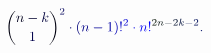 \documentclass[12pt]{article}
\begin{document}
\makeatletter
\renewcommand*{\@textcolor}[3]{%
  \protect\leavevmode
  \begingroup
    \color#1{#2}#3%
  \endgroup
}
\makeatother
\begin{displaymath}
{ \mathcolor[RGB]{0,0,15}{\binom { \mathcolor[RGB]{0,0,30}{n} \mathcolor[RGB]{0,0,45}{-} \mathcolor[RGB]{0,0,60}{k} } { \mathcolor[RGB]{0,0,75}{1} } } } ^ { \mathcolor[RGB]{0,0,90}{2} } \mathcolor[RGB]{0,0,105}{\cdot} \mathcolor[RGB]{0,0,120}{(} \mathcolor[RGB]{0,0,135}{n} \mathcolor[RGB]{0,0,150}{-} \mathcolor[RGB]{0,0,165}{1} \mathcolor[RGB]{0,0,180}{)} \mathcolor[RGB]{0,0,195}{!} ^ { \mathcolor[RGB]{0,0,210}{2} } \mathcolor[RGB]{0,0,225}{\cdot} \mathcolor[RGB]{0,0,240}{n} \mathcolor[RGB]{0,0,255}{!} ^ { \mathcolor[RGB]{0,15,0}{2} \mathcolor[RGB]{0,15,15}{n} \mathcolor[RGB]{0,15,30}{-} \mathcolor[RGB]{0,15,45}{2} \mathcolor[RGB]{0,15,60}{k} \mathcolor[RGB]{0,15,75}{-} \mathcolor[RGB]{0,15,90}{2} } \mathcolor[RGB]{0,15,105}{.}
\end{displaymath}
\end{document}
